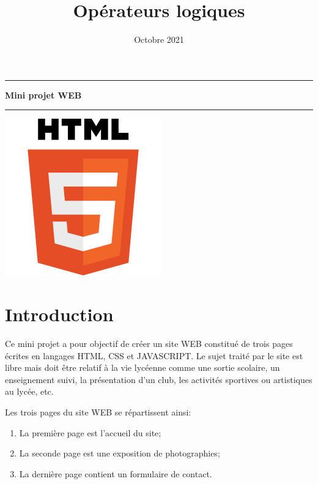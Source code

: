 \documentclass[11pt]{article}
\title{Opérateurs logiques}
\date{Octobre 2021}
\makeatletter
\providecommand{\tightlist}{%
      \setlength{\itemsep}{0pt}\setlength{\parskip}{0pt}}
\renewcommand\maketitle[1]{
\hrule\medskip
{\raggedright %
\begin{center}
{\Huge \bfseries \sffamily #1 }\\[4ex] 
\hrule \bigskip
\end{center}}} %
\makeatother
\begin{document}
    
    \maketitle{Mini projet WEB}
    

  

    

\begin{center}
\includegraphics[scale=0.4]{img/html.png}
\end{center}

    \hypertarget{introduction}{%
\section{Introduction}\label{introduction}}

Ce mini projet a pour objectif de créer un site WEB constitué de trois
pages écrites en langages HTML, CSS et JAVASCRIPT. Le sujet traité par
le site est libre mais doit être relatif à la vie lycéenne comme une
sortie scolaire, un enseignement suivi, la présentation d'un club, les
activités sportives ou artistiques au lycée, etc.

Les trois pages du site WEB se répartissent ainsi:

\begin{enumerate}
\def\labelenumi{\arabic{enumi}.}
\tightlist
\item
  La première page est l'accueil du site;
\item
  La seconde page est une exposition de photographies;
\item
  La dernière page contient un formulaire de contact.
\end{enumerate}
\end{document}
